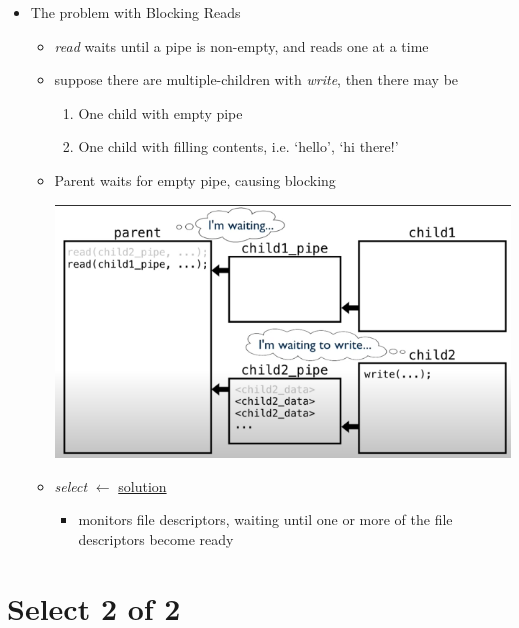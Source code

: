 \documentclass[12pt]{article}
\begin{document}
\begin{itemize}
    \item The problem with Blocking Reads
    \begin{itemize}
        \item \textit{read} waits until a pipe is non-empty, and reads one at a time
        \item suppose there are multiple-children with \textit{write}, then there may be
        \begin{enumerate}[1.]
            \item One child with empty pipe
            \item One child with filling contents, i.e. `hello', `hi there!'
        \end{enumerate}
        \item Parent waits for empty pipe, causing blocking

        \begin{center}
        \includegraphics[width=\linewidth]{images/week_10_notes_2_1.png}
        \end{center}
        \item \textit{select} $\leftarrow$ \underline{solution}
        \begin{itemize}
            \item monitors file descriptors, waiting until one or more of the file
            descriptors become ready
        \end{itemize}
    \end{itemize}
\end{itemize}


\bigskip

\section*{Select 2 of 2}
\end{document}
